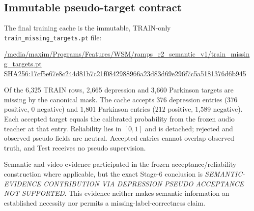 \subsection{Immutable pseudo-target contract}
\label{sec:pseudo}

The final training cache is the immutable, TRAIN-only \texttt{train\_missing\_targets.pt} file:
\begin{center}\scriptsize
\url{/media/maxim/Programs/Features/WSM/ramps_r2_semantic_v1/train_missing_targets.pt}\\
{\tiny\url{SHA256:17cf5e67e8c244d81b7c21f0842988966a23d83d69e296f7c5a5181376d6b945}}
\end{center}
Of the 6,325 TRAIN rows, 2,665 depression and 3,660 Parkinson targets are missing by the canonical mask. The cache accepts 376 depression entries (376 positive, 0 negative) and 1,801 Parkinson entries (212 positive, 1,589 negative). Each accepted target equals the calibrated probability from the frozen audio teacher at that entry. Reliability lies in $[0,1]$ and is detached; rejected and observed pseudo fields are neutral. Accepted entries cannot overlap observed truth, and Test receives no pseudo supervision.

Semantic and video evidence participated in the frozen acceptance/reliability construction where applicable, but the exact Stage-6 conclusion is \emph{SEMANTIC-EVIDENCE CONTRIBUTION VIA DEPRESSION PSEUDO ACCEPTANCE NOT SUPPORTED}. This evidence neither makes semantic information an established necessity nor permits a missing-label-correctness claim.

